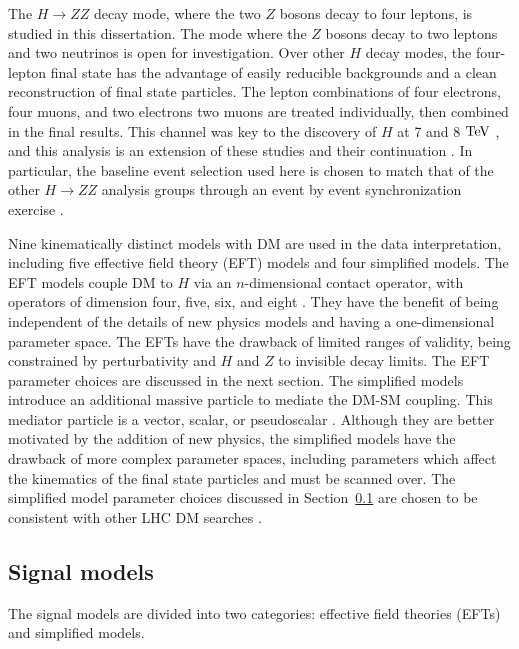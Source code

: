 The $H\rightarrow ZZ$ decay mode, where the two $Z$ bosons decay to four leptons, is studied in this dissertation. The mode where the $Z$ bosons decay to two leptons and two neutrinos is open for investigation. Over other $H$ decay modes, the four-lepton final state has the advantage of easily reducible backgrounds and a clean reconstruction of final state particles. The lepton combinations of four electrons, four muons, and two electrons two muons are treated individually, then combined in the final results. This channel was key to the discovery of $H$ at 7 and 8 $\mathrm{Te\kern -0.1em V}$ \cite{Chatrchyan:2013mxa, ATLAS:2013nma}, and this analysis is an extension of these studies and their continuation \cite{CMS-AN-15-277, CMS-PAS-HIG-15-004}. In particular, the baseline event selection used here is chosen to match that of the other $H\rightarrow ZZ$ analysis groups through an event by event synchronization exercise \cite{synchtwiki}.

Nine kinematically distinct models with DM are used in the data interpretation, including five effective field theory (EFT) models and four simplified models. The EFT models couple DM to $H$ via an $n$-dimensional contact operator, with operators of dimension four, five, six, and eight \cite{Carpenter:2013xra}. They have the benefit of being independent of the details of new physics models and having a one-dimensional parameter space. The EFTs have the drawback of limited ranges of validity, being constrained by perturbativity and $H$ and $Z$ to invisible decay limits. The EFT parameter choices are discussed in the next section. The simplified models introduce an additional massive particle to mediate the DM-SM coupling. This mediator particle is a vector, scalar, or pseudoscalar \cite{Carpenter:2013xra, Berlin:2014cfa}. Although they are better motivated by the addition of new physics, the simplified models have the drawback of more complex parameter spaces, including parameters which affect the kinematics of the final state particles and must be scanned over. The simplified model parameter choices discussed in Section~\ref{sec:sigmodels} are chosen to be consistent with other LHC DM searches \cite{Abercrombie:2015wmb}.

\subsection{Signal models}
\label{sec:sigmodels}
The signal models are divided into two categories: effective field theories (EFTs) and simplified models.

